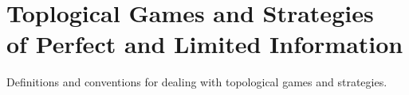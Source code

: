 
\chapter{Toplogical Games and Strategies\\ of Perfect and Limited Information}

Definitions and conventions for dealing with topological games and strategies.